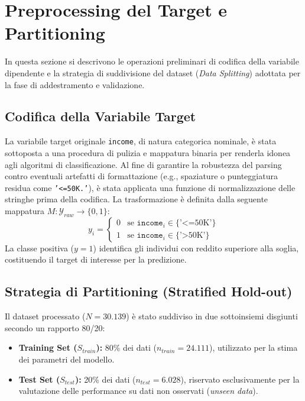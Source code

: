 \setcounter{figure}{0}
\renewcommand{\thefigure}{A.\arabic{figure}}
\setcounter{table}{0}
\renewcommand{\thetable}{A.\arabic{table}}

\section{Preprocessing del Target e Partitioning}
\label{app:data_splitting}

In questa sezione si descrivono le operazioni preliminari di codifica della variabile dipendente e la strategia di suddivisione del dataset (\textit{Data Splitting}) adottata per la fase di addestramento e validazione.

\subsection{Codifica della Variabile Target}

La variabile target originale \texttt{income}, di natura categorica nominale, è stata sottoposta a una procedura di pulizia e mappatura binaria per renderla idonea agli algoritmi di classificazione.
Al fine di garantire la robustezza del parsing contro eventuali artefatti di formattazione (e.g., spaziature o punteggiatura residua come \texttt{'<=50K.'}), è stata applicata una funzione di normalizzazione delle stringhe prima della codifica.
\noindent
La trasformazione è definita dalla seguente mappatura $M: \mathcal{Y}_{raw} \to \{0, 1\}$:
\begin{equation}
    y_i = 
    \begin{cases} 
    0 & \text{se } \texttt{income}_i \in \{\text{'<=50K'}\} \\
    1 & \text{se } \texttt{income}_i \in \{\text{'>50K'}\}
    \end{cases}
\end{equation}
La classe positiva ($y=1$) identifica gli individui con reddito superiore alla soglia, costituendo il target di interesse per la predizione.

\subsection{Strategia di Partitioning (Stratified Hold-out)}

Il dataset processato ($N=30.139$) è stato suddiviso in due sottoinsiemi disgiunti secondo un rapporto 80/20:
\begin{itemize}
    \item \textbf{Training Set ($S_{train}$):} 80\% dei dati ($n_{train} = 24.111$), utilizzato per la stima dei parametri del modello.
    \item \textbf{Test Set ($S_{test}$):} 20\% dei dati ($n_{test} = 6.028$), riservato esclusivamente per la valutazione delle performance su dati non osservati (\textit{unseen data}).
\end{itemize}

